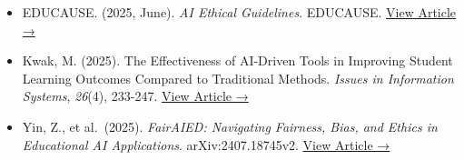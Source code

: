 \documentclass[
  11pt,
  letterpaper,
  DIV=11,
  numbers=noendperiod]{scrartcl}
\begin{document}
\begin{itemize}
  higher education in the AI era. \emph{Open Research Europe},
  \emph{5}(249).
  \href{https://pmc.ncbi.nlm.nih.gov/articles/PMC12438950/pdf/openreseurope-5-22406.pdf}{View
  Article →}
\item
  EDUCAUSE. (2025, June). \emph{AI Ethical Guidelines}. EDUCAUSE.
  \href{https://library.educause.edu/resources/2025/6/ai-ethical-guidelines}{View
  Article →}
\item
  Kwak, M. (2025). The Effectiveness of AI-Driven Tools in Improving
  Student Learning Outcomes Compared to Traditional Methods.
  \emph{Issues in Information Systems}, \emph{26}(4), 233-247.
  \href{https://iacis.org/iis/2025/4_iis_2025_233-247.pdf}{View Article
  →}
\item
  Yin, Z., et al.~(2025). \emph{FairAIED: Navigating Fairness, Bias, and
  Ethics in Educational AI Applications}. arXiv:2407.18745v2.
  \href{https://arxiv.org/pdf/2407.18745v2}{View Article →}
\end{itemize}
\end{document}
